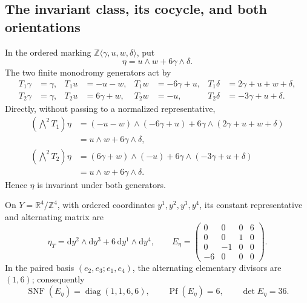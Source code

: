 \subsection{The invariant class, its cocycle, and both orientations}

In the ordered marking
\(\mathbb Z\langle\gamma,u,w,\delta\rangle\), put
\begin{equation}
 \eta=u\wedge w+6\gamma\wedge\delta.
 \label{cusp-native-full-flux-class}
\end{equation}
The two finite monodromy generators act by
\begin{align*}
T_1\gamma&=\gamma,&T_1u&=-u-w,&
T_1w&=-6\gamma+u,&T_1\delta&=2\gamma+u+w+\delta,\\
T_2\gamma&=\gamma,&T_2u&=6\gamma+w,&
T_2w&=-u,&T_2\delta&=-3\gamma+u+\delta.
\end{align*}
Directly, without passing to a normalized representative,
\begin{align*}
(\bigwedge^2T_1)\eta
&=(-u-w)\wedge(-6\gamma+u)
 +6\gamma\wedge(2\gamma+u+w+\delta)\\
&=u\wedge w+6\gamma\wedge\delta,\\
(\bigwedge^2T_2)\eta
&=(6\gamma+w)\wedge(-u)
 +6\gamma\wedge(-3\gamma+u+\delta)\\
&=u\wedge w+6\gamma\wedge\delta.
\end{align*}
Hence \(\eta\) is invariant under both generators.

On \(Y=\mathbb R^4/\mathbb Z^4\), with ordered coordinates
\(y^1,y^2,y^3,y^4\), its constant representative and alternating matrix are
\begin{equation}
 \eta_T=\mathrm dy^2\wedge\mathrm dy^3
       +6\,\mathrm dy^1\wedge\mathrm dy^4,
 \qquad
 E_\eta=
 \begin{pmatrix}
 0&0&0&6\\
 0&0&1&0\\
 0&-1&0&0\\
 -6&0&0&0
 \end{pmatrix}.
 \label{cusp-native-full-flux-form-matrix}
\end{equation}
In the paired basis \((e_2,e_3;e_1,e_4)\), the alternating elementary
divisors are \((1,6)\); consequently
\begin{equation}
 \operatorname{SNF}(E_\eta)=\operatorname{diag}(1,1,6,6),
 \qquad \operatorname{Pf}(E_\eta)=6,
 \qquad \det E_\eta=36.
 \label{cusp-native-full-flux-smith-pfaffian}
\end{equation}

